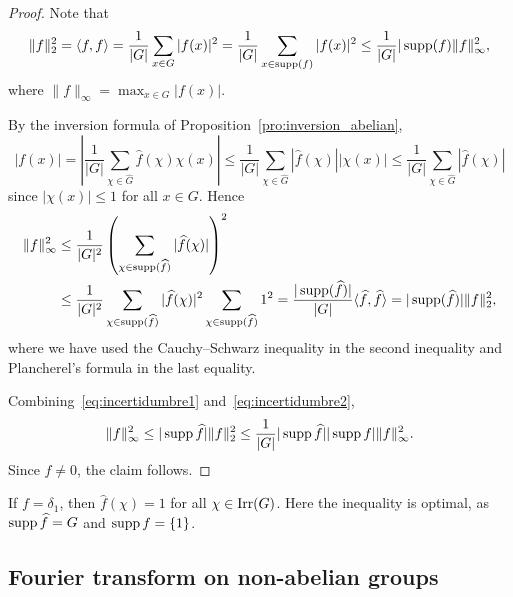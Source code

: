 \begin{proof}
    Note that  
    \begin{equation}
    \label{eq:incertidumbre1}
	\|f\|_2^2=\langle f,f\rangle=\frac{1}{|G|}\sum_{x\in G}|f(x)|^2=\frac{1}{|G|}\sum_{x\in\operatorname{supp}(f)}|f(x)|^2\leq\frac{1}{|G|}|\operatorname{supp}(f)\|f\|^2_{\infty},
      \end{equation}
  where $\|f\|_{\infty}=\max_{x\in G}|f(x)|$.

  By the inversion formula of Proposition~\ref{pro:inversion_abelian}, 
  \[
	|f(x)|=\left|\frac{1}{|G|}\sum_{\chi\in\widehat{G}}\widehat{f}(\chi)\chi(x)\right|
	\leq \frac{1}{|G|}\sum_{\chi\in\widehat{G}}|\widehat{f}(\chi)||\chi(x)|
	\leq \frac{1}{|G|}\sum_{\chi\in\widehat{G}}|\widehat{f}(\chi)|
  \]
  since $|\chi(x)|\leq 1$ for all $x\in G$. Hence 
  \begin{equation}
    \label{eq:incertidumbre2}
  \begin{aligned}
	\|f\|^2_{\infty}
	&\leq \frac{1}{|G|^2}\left(\sum_{\chi\in\operatorname{supp}(\widehat{f})}|\widehat{f}(\chi)|\right)^2\\
	&\leq \frac{1}{|G|^2}\sum_{\chi\in\operatorname{supp}(\widehat{f})}|\widehat{f}(\chi)|^2\sum_{\chi\in\operatorname{supp}(\widehat{f})}1^2
	=\frac{|\operatorname{supp}(\widehat{f})|}{|G|}\langle \widehat{f},\widehat{f}\rangle
	=|\operatorname{supp}(\widehat{f})|\|f\|^2_2,
  \end{aligned}
  \end{equation}
  where we have used the Cauchy--Schwarz inequality in the second inequality and 
  Plancherel's formula in the last equality. 

  Combining~\eqref{eq:incertidumbre1} and~\eqref{eq:incertidumbre2}, 
  \[
	\|f\|^2_{\infty}\leq |\operatorname{supp}\widehat{f}|\|f\|^2_2
	\leq \frac{1}{|G|}|\operatorname{supp}\widehat{f}||\operatorname{supp} f|\|f\|^2_{\infty}.
  \]
  Since $f\ne0$, the claim follows. 
\end{proof}

\begin{example}
  If $f=\delta_1$, then $\widehat{f}(\chi)=1$ for all $\chi\in\operatorname{Irr}(G)$.
  Here the inequality is optimal, as 
  $\operatorname{supp}\widehat{f}=G$ and $\operatorname{supp} f=\{1\}$.
\end{example}


\subsection{Fourier transform on non-abelian groups}

